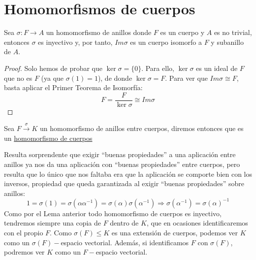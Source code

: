 \section{Homomorfismos de cuerpos}

\begin{lema}
    Sea $\sigma:F\to A$ un homomorfismo de anillos donde $F$ es un cuerpo y $A$ es no trivial, entonces $\sigma$ es inyectivo y, por tanto, $Im \sigma$ es un cuerpo isomorfo a $F$ y subanillo de $A$.
    \begin{proof}
        Solo hemos de probar que $\ker \sigma = \{0\}$. Para ello, $\ker \sigma$ es un ideal de $F$ que no es $F$ (ya que $\sigma(1) = 1$), de donde $\ker \sigma = F$. Para ver que $Im \sigma\cong F$, basta aplicar el Primer Teorema de Isomorfía:
        \begin{equation*}
            F = \dfrac{F}{\ker \sigma} \cong Im \sigma
        \end{equation*}
    \end{proof}
\end{lema}

\begin{definicion}
    Sea $F\stackrel{\sigma}{\to} K$ un homomorfismo de anillos entre cuerpos, diremos entonces que es un \underline{homomorfismo de cuerpos}
\end{definicion}

\begin{observacion}
    Resulta sorprendente que exigir ``buenas propiedades'' a una aplicación entre anillos ya nos da una aplicación con ``buenas propiedades'' entre cuerpos, pero resulta que lo único que nos faltaba era que la aplicación se comporte bien con los inversos, propiedad que queda garantizada al exigir ``buenas propiedades'' sobre anillos:
    \begin{equation*}
        1 = \sigma(1) = \sigma\left(\alpha\alpha^{-1}\right) = \sigma(\alpha)\sigma\left(\alpha^{-1}\right) \Longrightarrow \sigma\left(\alpha^{-1}\right) = {\sigma(\alpha)}^{-1}
    \end{equation*}
    Como por el Lema anterior todo homomorfismo de cuerpos es inyectivo, tendremos siempre una copia de $F$ dentro de $K$, que en ocasiones identificaremos con el propio $F$. Como $\sigma(F)\leq K$ es una extensión de cuerpos, podemos ver $K$ como un $\sigma(F)-$espacio vectorial. Además, si identificamos $F$ con $\sigma(F)$, podremos ver $K$ como un $F-$espacio vectorial.
\end{observacion}

